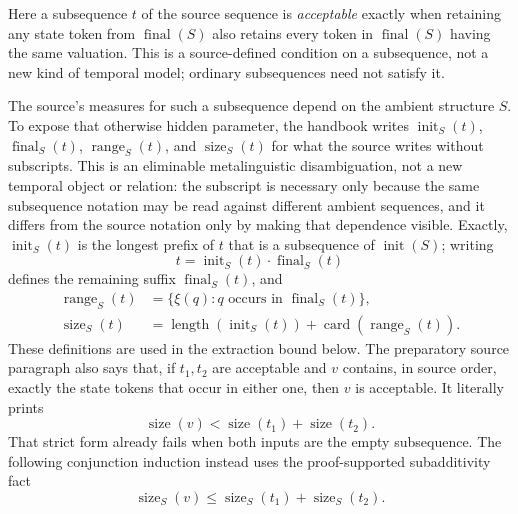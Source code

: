 Here a subsequence \(t\) of the source sequence is \emph{acceptable} exactly
when retaining any state token from \(\operatorname{final}(S)\) also retains
every token in \(\operatorname{final}(S)\) having the same valuation.  This is
a source-defined condition on a subsequence, not a new kind of temporal model;
ordinary subsequences need not satisfy it.

The source's measures for such a subsequence depend on the ambient structure
\(S\).  To expose that otherwise hidden parameter, the handbook writes
\(\operatorname{init}_{S}(t)\), \(\operatorname{final}_{S}(t)\),
\(\operatorname{range}_{S}(t)\), and \(\operatorname{size}_{S}(t)\) for what
the source writes without subscripts.  This is an eliminable metalinguistic
disambiguation, not a new temporal object or relation: the subscript is
necessary only because the same subsequence notation may be read against
different ambient sequences, and it differs from the source notation only by
making that dependence visible.  Exactly,
\(\operatorname{init}_{S}(t)\) is the longest prefix of \(t\) that is a
subsequence of \(\operatorname{init}(S)\); writing
\[
 t=\operatorname{init}_{S}(t)\mathbin{\cdot}
   \operatorname{final}_{S}(t)
\]
defines the remaining suffix \(\operatorname{final}_{S}(t)\), and
\[
\begin{aligned}
 \operatorname{range}_{S}(t)
 &=\{\xi(q):q\text{ occurs in }\operatorname{final}_{S}(t)\},\\
 \operatorname{size}_{S}(t)
 &=\operatorname{length}(\operatorname{init}_{S}(t))
   +\operatorname{card}(\operatorname{range}_{S}(t)).
\end{aligned}
\]
These definitions are used in the extraction bound below.  The preparatory
source paragraph also says that, if \(t_1,t_2\) are acceptable and \(v\)
contains, in source order, exactly the state tokens that occur in either one,
then \(v\) is acceptable.  It literally prints
\[
 \operatorname{size}(v)
 <
 \operatorname{size}(t_1)+\operatorname{size}(t_2).
\]
That strict form already fails when both inputs are the empty subsequence.
The following conjunction induction instead uses the proof-supported
subadditivity fact
\[
 \operatorname{size}_{S}(v)
 \le
 \operatorname{size}_{S}(t_1)+\operatorname{size}_{S}(t_2).
\]

